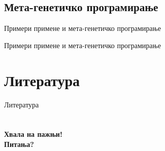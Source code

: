 \documentclass{beamer}
\begin{document}
\subsection[Мета-генетичко програмирање]{Мета-генетичко програмирање}

    \begin{frame}{Примери примене и мета-генетичко програмирање}
    \end{frame}
    
    \begin{frame}{Примери примене и мета-генетичко програмирање}
    \end{frame}
    
\section{Литература}
    \begin{frame}{Литература}
    \end{frame}
    
\section{}
\begin{frame}{}
    \centering
        \Huge\bfseries{Хвала на пажњи!\\ Питања?}
\end{frame}
\end{document}
